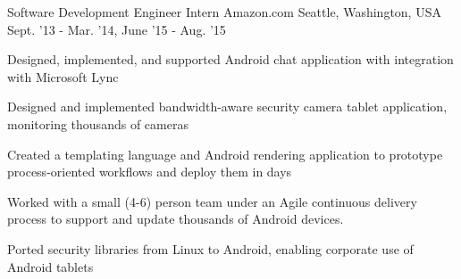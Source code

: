 \begin{cventries}
{    }
\vspace{2mm}
\cventry
    {Software Development Engineer Intern} %
    {Amazon.com} %
    {Seattle, Washington, USA} %
    {Sept. '13 - Mar. '14,
    June '15 - Aug. '15} %
    {
        \begin{cvitems}
            \item Designed, implemented, and supported Android chat application with integration with Microsoft Lync
            \item Designed and implemented bandwidth-aware security camera tablet application, monitoring thousands of cameras
            \item Created a templating language and Android rendering application to prototype process-oriented workflows and deploy them in days
            \item Worked with a small (4-6) person team under an Agile continuous delivery process to support and update thousands of Android devices.
            \item Ported security libraries from Linux to Android, enabling corporate use of Android tablets
        \end{cvitems}
    }
\end{cventries}
